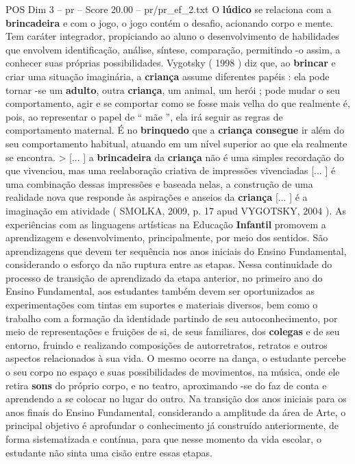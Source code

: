 \begin{textsample}{POS Dim 3 – pr – Score 20.00 – pr/pr\_ef\_2.txt}
O \textbf{lúdico} se relaciona com a \textbf{brincadeira} e com o jogo, o jogo contém o desafio, acionando corpo e mente.
Tem caráter integrador, propiciando ao aluno o desenvolvimento de habilidades que envolvem identificação, análise, síntese, comparação, permitindo -o assim, a conhecer suas próprias possibilidades.
Vygotsky ( 1998 ) diz que, ao \textbf{brincar} e criar uma situação imaginária, a \textbf{criança} assume diferentes papéis : ela pode tornar -se um \textbf{adulto}, outra \textbf{criança}, um animal, um herói ; pode mudar o seu comportamento, agir e se comportar como se fosse mais velha do que realmente é, pois, ao representar o papel de “ mãe ”, ela irá seguir as regras de comportamento maternal.
É no \textbf{brinquedo} que a \textbf{criança} \textbf{consegue} ir além do seu comportamento habitual, atuando em um nível superior ao que ela realmente se encontra. > [... ] a \textbf{brincadeira} da \textbf{criança} não é uma simples recordação do que vivenciou, mas uma reelaboração criativa de impressões vivenciadas [... ] é uma combinação dessas impressões e baseada nelas, a construção de uma realidade nova que responde às aspirações e anseios da \textbf{criança} [... ] é a imaginação em atividade ( SMOLKA, 2009, p. 17 apud VYGOTSKY, 2004 ).
As experiências com as linguagens artísticas na Educação \textbf{Infantil} promovem a aprendizagem e desenvolvimento, principalmente, por meio dos sentidos.
São aprendizagens que devem ter sequência nos anos iniciais do Ensino Fundamental, considerando o esforço da não ruptura entre as etapas.
Nessa continuidade do processo de transição de aprendizado da etapa anterior, no primeiro ano do Ensino Fundamental, aos estudantes também devem ser oportunizados as experimentações com tintas em suportes e materiais diversos, bem como o trabalho com a formação da identidade partindo de seu autoconhecimento, por meio de representações e fruições de si, de seus familiares, dos \textbf{colegas} e de seu entorno, fruindo e realizando composições de autorretratos, retratos e outros aspectos relacionados à sua vida.
O mesmo ocorre na dança, o estudante percebe o seu corpo no espaço e suas possibilidades de movimentos, na música, onde ele retira \textbf{sons} do próprio corpo, e no teatro, aproximando -se do faz de conta e aprendendo a se colocar no lugar do outro.
Na transição dos anos iniciais para os anos finais do Ensino Fundamental, considerando a amplitude da área de Arte, o principal objetivo é aprofundar o conhecimento já construído anteriormente, de forma sistematizada e contínua, para que nesse momento da vida escolar, o estudante não sinta uma cisão entre essas etapas.

\end{textsample}
